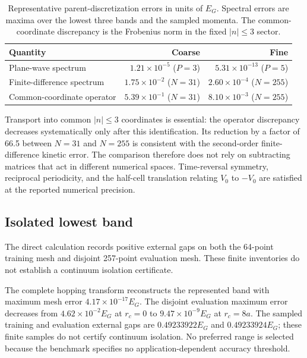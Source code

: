 \begin{table}[htbp]
  \centering
  \caption{Representative parent-discretization errors in units of $E_G$.
  Spectral errors are maxima over the lowest three bands and the sampled
  momenta. The common-coordinate discrepancy is the Frobenius norm in the fixed
  $|n|\leq3$ sector.}
  \label{tab:periodic-1d-parent-convergence}
  \small
  \begin{tabular}{lrr}
    \toprule
    Quantity & Coarse & Fine \\
    \midrule
    Plane-wave spectrum &
    $1.21\times10^{-5}$ ($P=3$) & $5.31\times10^{-13}$ ($P=5$) \\
    Finite-difference spectrum &
    $1.75\times10^{-2}$ ($N=31$) & $2.60\times10^{-4}$ ($N=255$) \\
    Common-coordinate operator &
    $5.39\times10^{-1}$ ($N=31$) & $8.10\times10^{-3}$ ($N=255$) \\
    \bottomrule
  \end{tabular}
\end{table}

Transport into common $|n|\leq3$ coordinates is essential: the operator
discrepancy decreases systematically only after this identification. Its
reduction by a factor of 66.5 between $N=31$ and $N=255$ is consistent with the
second-order finite-difference kinetic error. The comparison therefore does not
rely on subtracting matrices that act in different numerical spaces.
Time-reversal symmetry, reciprocal periodicity,
and the half-cell translation relating $V_0$ to $-V_0$ are satisfied at the
reported numerical precision.

\subsection{Isolated lowest band}

The direct calculation records positive external gaps on both the 64-point training
mesh and disjoint 257-point evaluation mesh. These finite inventories do not establish a
continuum isolation certificate.

The complete hopping transform reconstructs the represented band with maximum
mesh error $4.17\times10^{-17}E_G$. The disjoint evaluation maximum error decreases
from $4.62\times10^{-2}E_G$ at $r_c=0$ to $9.47\times10^{-9}E_G$ at $r_c=8a$.
The sampled training and evaluation external gaps are $0.49233922E_G$ and
$0.49233924E_G$; these finite samples do not certify continuum isolation. No preferred
range is selected because the benchmark specifies no application-dependent accuracy
threshold.

